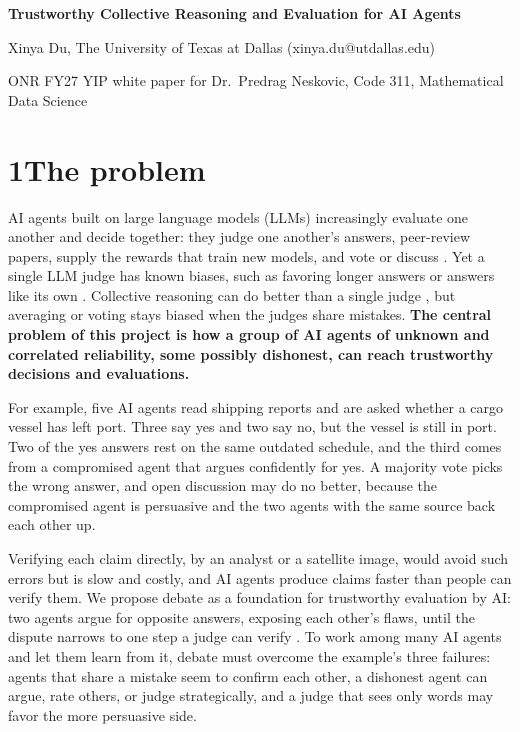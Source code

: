 \documentclass[12pt,letterpaper]{article}
\begin{document}
\begin{center}
{\large\bfseries Trustworthy Collective Reasoning and Evaluation for AI Agents\par}
\vspace{3pt}
Xinya Du, The University of Texas at Dallas (xinya.du@utdallas.edu)\par
ONR FY27 YIP white paper for Dr.\ Predrag Neskovic, Code 311, Mathematical Data Science\par
\end{center}

\section*{1\quad The problem}
AI agents built on large language models (LLMs) increasingly evaluate one another and decide together: they judge one another's answers, peer-review papers, supply the rewards that train new models, and vote or discuss \citep{zheng2023judging,luo2025llm4sr,lee2024rlaif}. Yet a single LLM judge has known biases, such as favoring longer answers or answers like its own \citep{zheng2023judging,panickssery2024self}. Collective reasoning can do better than a single judge \citep{verga2024juries,du2024debate}, but averaging or voting stays biased when the judges share mistakes. \textbf{The central problem of this project is how a group of AI agents of unknown and correlated reliability, some possibly dishonest, can reach trustworthy decisions and evaluations.}

For example, five AI agents read shipping reports and are asked whether a cargo vessel has left port. Three say yes and two say no, but the vessel is still in port. Two of the yes answers rest on the same outdated schedule, and the third comes from a compromised agent that argues confidently for yes. A majority vote picks the wrong answer, and open discussion may do no better, because the compromised agent is persuasive and the two agents with the same source back each other up.

Verifying each claim directly, by an analyst or a satellite image, would avoid such errors but is slow and costly, and AI agents produce claims faster than people can verify them. We propose debate as a foundation for trustworthy evaluation by AI: two agents argue for opposite answers, exposing each other's flaws, until the dispute narrows to one step a judge can verify \citep{irving2018debate}. To work among many AI agents and let them learn from it, debate must overcome the example's three failures: agents that share a mistake seem to confirm each other, a dishonest agent can argue, rate others, or judge strategically, and a judge that sees only words may favor the more persuasive side.
\end{document}
